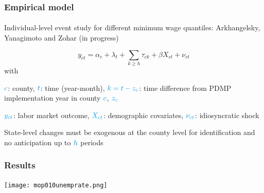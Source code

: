 
\begin{frame}

    \frametitle{Empirical model} %
    \framesubtitle{}  %
    \rmfamily %
    
    \begin{wideitemize}
        \item Individual-level event study for different minimum wage quantiles: \textcolor{fgre}{Arkhangelsky, Yanagimoto and Zohar (in progress)}
    \end{wideitemize}
    
    \begin{equation*}
        y_{ct} = \alpha_c + \lambda_t + \sum_{k\geq h}\tau_{ck} + \beta X_{ct} + \nu_{ct}
    \end{equation*}
    with 
    \vspace{9pt}
    \begin{wideitemize}
        \item[\textcolor{fblu}{\textbullet}] \(\textcolor{fblu}{c}\): county, \(\textcolor{fblu}{t}\): time (year-month), \(\textcolor{fblu}{k = t - z_c}\): time difference from PDMP implementation year in county \(\textcolor{fblu}{c}\), \(\textcolor{fblu}{z_c}\)
        \item[\textcolor{fblu}{\textbullet}] \(\textcolor{fblu}{y_{ct}}\): labor market outcome, \(\textcolor{fblu}{X_{ct}}\): demographic covariates, \(\textcolor{fblu}{\nu_{ct}}\): idiosyncratic shock 
    \end{wideitemize}
    \vspace{9pt}
    State-level changes must be exogenous at the county level for \textcolor{fblu}{identification} and no anticipation up to \(\textcolor{fblu}{h}\) periods
    
\end{frame}

\begin{frame}

    \label{unemp_rate_result}
    \frametitle{Results} %
    \framesubtitle{}  %
    \rmfamily %
    
    \begin{center}
        \texttt{[image: mop010unemprate.png]}
    \end{center}

    \hyperlink{perc_comparison_1}{}
    \hyperlink{dist_1}{}

\end{frame}


